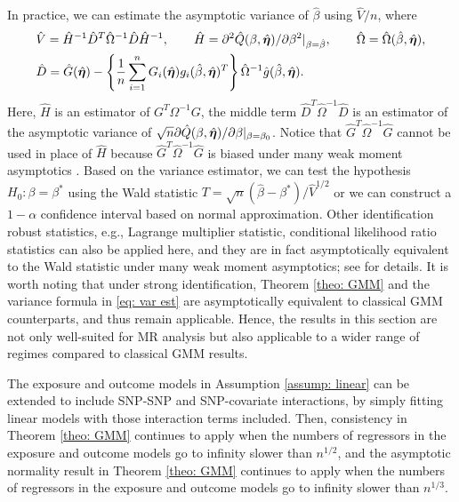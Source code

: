 \documentclass[12pt]{article}
\begin{document}
In practice, we can estimate the asymptotic variance of $ \hat \beta $ using $ \hat{V}/n$, where
\begin{equation}
\begin{aligned}
 &\hat{V} =\hat{H}^{-1} \hat{D}^T \hat{\Omega}^{-1} \hat{D} \hat{H}^{-1}, \qquad \hat{H}= \partial^2 \hat{Q}({{ \beta}},  \hat{\bm \eta})/  \partial { \beta}^2|_{{ \beta}= \hat{{ \beta}}}, \qquad \hat{\Omega}=\hat \Omega (\hat{{ \beta}},  \hat{\bm \eta}),\\
 &\hat{D}=  \hat G( \hat{\bm \eta})-  \left\{  \frac1n   \sum_{i=1}^n  G_i( \hat{\bm \eta}) g_i(\hat {{ \beta}}, \hat{\bm \eta})^T \right\} \hat{\Omega}^{-1} \hat{g}(\hat {{ \beta}},  \hat{\bm \eta}	).  \label{eq: var est}
\end{aligned}
\end{equation}
   Here, $ \hat{H} $ is an estimator of $ G^T \Omega^{-1} G $, the middle term $ \hat{D}^T \hat{\Omega}^{-1} \hat{D} $ is an estimator  of  the asymptotic variance of $\sqrt{n} \partial \hat{Q} ({ \beta}, \hat {\bm \eta})/\partial { \beta}|_{{ \beta}={ \beta}_0} $.  Notice that $ \hat{G}^T\hat{\Omega}^{-1}\hat{G} $ cannot be used in place of $ \hat{H} $ because $ \hat{G}^T\hat{\Omega}^{-1}\hat{G} $ is biased under many weak moment asymptotics \citep{Newey:2009aa}.  Based on the variance estimator, we can test the hypothesis $H_0: \beta=\beta^* $ using the Wald statistic $ T= \sqrt{n}(\hat{\beta}- \beta^*)/ \hat{V}^{1/2}$ or we can construct a $ 1-\alpha $ confidence interval based on normal approximation. Other identification robust statistics, e.g., Lagrange multiplier statistic, conditional likelihood ratio statistics can also be applied here, and they are in fact asymptotically equivalent to the Wald statistic under many weak moment asymptotics; see \cite{Newey:2009aa} for details.  It is worth noting that  under strong identification, Theorem \ref{theo: GMM} and the variance formula in \eqref{eq: var est}  are asymptotically equivalent to classical GMM counterparts,  and thus remain applicable. Hence, the results in this section are not only well-suited for MR analysis but also applicable to a wider range of regimes compared to classical GMM results. 


			The exposure and outcome models in Assumption \ref{assump: linear} can be extended to include SNP-SNP and SNP-covariate interactions, by simply fitting linear models with those interaction terms included. Then, consistency in Theorem \ref{theo: GMM} continues to apply when the numbers of regressors in the exposure and outcome models go to infinity slower than $n^{1/2}$, and the asymptotic normality result in Theorem \ref{theo: GMM} continues to apply when the numbers of regressors in the exposure and outcome models go to infinity slower than $n^{1/3}$. 
\end{document}
